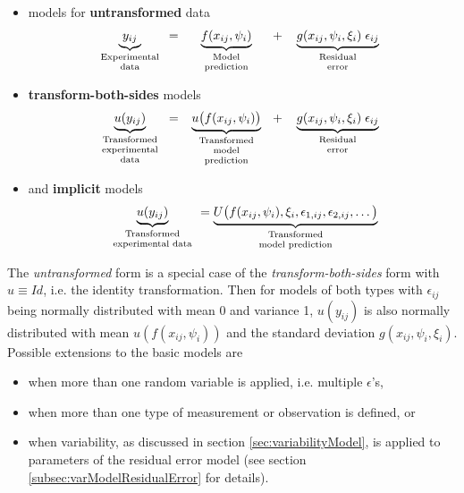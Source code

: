 \begin{itemize}\addtolength{\itemsep}{-.95\baselineskip}
\item
models for \textbf{untransformed} data
\begin{align*}
 \underbrace{ y_{ij}}_{\text{\parbox{2cm}{\centering Experimental \\[-4pt]  data}}} =
 \underbrace{ f(x_{ij}, \psi_{i})}_{\text{\parbox{2.5cm}{\centering Model \\[-4pt]  prediction}}} +
 \underbrace{ g(x_{ij}, \psi_{i}, \xi_i) \; \epsilon_{ij}}_{\text{\parbox{3cm}{\centering Residual \\[-4pt] error}}}
 \end{align*}
 \item
\textbf{transform-both-sides} models
\begin{eqnarray}
 \underbrace{ u(y_{ij})}_{\text{\parbox{2cm}{\centering Transformed \\[-4pt] experimental \\[-4pt]  data}}} =
 \underbrace{ u\big(f(x_{ij}, \psi_{i})\big)}_{\text{\parbox{2.5cm}{\centering Transformed \\[-4pt]  model \\[-4pt]  prediction}}} +
 \underbrace{ g(x_{ij}, \psi_{i}, \xi_i) \; \epsilon_{ij}}_{\text{\parbox{3cm}{\centering Residual \\[-4pt] error}}} \nonumber
 \end{eqnarray}
 \item
and \textbf{implicit} models
\begin{eqnarray}
 \underbrace{ u(y_{ij})}_{\text{\parbox{2.5cm}{\centering Transformed \\[-4pt] experimental  data}}} =
 \underbrace{ U\big(f(x_{ij}, \psi_{i}),\xi_i, \epsilon_{1,ij}, \epsilon_{2,ij}, \dots\big)}_{\text{\parbox{2.5cm}{\centering Transformed \\[-4pt]  model prediction}}} \nonumber
 \end{eqnarray}
\end{itemize}
The \textit{untransformed} form is a special case of the \textit{transform-both-sides} form with $u \equiv Id$, i.e. the identity transformation.
Then for models of both types with $\epsilon_{ij}$ being normally distributed with mean 0 and variance 1, $u(y_{ij})$ is also normally distributed
with mean $u(f(x_{ij}, \psi_{i}))$ and the standard deviation $g(x_{ij}, \psi_{i}, \xi_i)$. \\
Possible extensions to the basic models are
\begin{itemize}
\item
when more than one random variable is applied, i.e. multiple $\epsilon$'s,
\item
when more than one type of measurement or observation is defined, or
\item
when variability, as discussed in section \ref{sec:variabilityModel}, is applied to parameters of the residual error model (see section \ref{subsec:varModelResidualError} for details).
\end{itemize}


